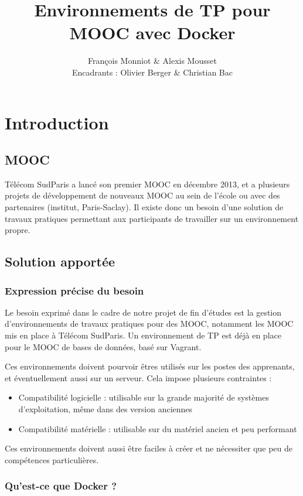 \documentclass[a4paper,11pt]{report}
\title{Environnements de TP pour MOOC avec Docker}
\author{François Monniot \& Alexis Mousset\\Encadrants : Olivier Berger \& Christian Bac}
\begin{document}
\maketitle
\tableofcontents

\thispagestyle{fancy}
\chapter{Introduction}
\thispagestyle{fancy}
\section{MOOC}

Télécom SudParis a lancé son premier MOOC en décembre 2013, et a plusieurs projets de développement de nouveaux MOOC au sein de l'école ou avec des partenaires (institut, Paris-Saclay). Il existe donc un besoin d'une solution de travaux pratiques permettant aux participants de travailler sur un environnement propre.

\section{Solution apportée}

\subsection{Expression précise du besoin}

Le besoin exprimé dans le cadre de notre projet de fin d'études est la gestion d'environnements de travaux pratiques pour des MOOC, notamment les MOOC mis en place à Télécom SudParis. Un environnement de TP est déjà en place pour le MOOC de bases de données, basé sur Vagrant.

Ces environnements doivent pourvoir êtres utilisés sur les postes des apprenants, et éventuellement aussi sur un serveur. Cela impose plusieurs contraintes :
\begin{itemize}
  \item Compatibilité logicielle : utilisable sur la grande majorité de systèmes d'exploitation, même dans des version anciennes
  \item Compatibilité matérielle : utilisable sur du matériel ancien et peu performant
\end{itemize}

Ces environnements doivent aussi être faciles à créer et ne nécessiter que peu de compétences
particulières.

\subsection{Qu'est-ce que Docker ?}
\end{document}
